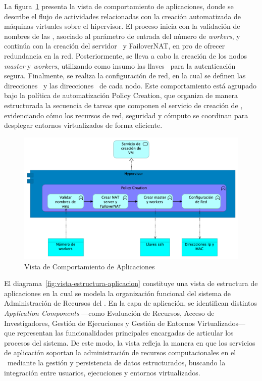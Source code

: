\noindent
La figura~\ref{fig:vista-comportamiento-aplicacion} presenta la vista de comportamiento de aplicaciones, donde se describe el flujo de actividades relacionadas con la creación automatizada de máquinas virtuales sobre el hipervisor. El proceso inicia con la validación de nombres de las \VM, asociado al parámetro de entrada del número de \textit{workers}, y continúa con la creación del servidor \NAT\ y FailoverNAT, en pro de ofrecer redundancia en la red. Posteriormente, se lleva a cabo la creación de los nodos \textit{master} y \textit{workers}, utilizando como insumo las llaves \SSH\ para la autenticación segura. Finalmente, se realiza la configuración de red, en la cual se definen las direcciones \IP\ y las direcciones \MAC\ de cada nodo. Este comportamiento está agrupado bajo la política de automatización Policy Creation, que organiza de manera estructurada la secuencia de tareas que componen el servicio de creación de \VM, evidenciando cómo los recursos de red, seguridad y cómputo se coordinan para desplegar entornos virtualizados de forma eficiente.
\begin{figure}[H]
    \centering
    \includegraphics[width=\textwidth]{tablas-images/cp6/Application-Behaviour-view.png}
    \caption{Vista de Comportamiento de Aplicaciones}\label{fig:vista-comportamiento-aplicacion}
\end{figure}
\noindent
El diagrama~\ref{fig:vista-estructura-aplicacion} constituye una vista de estructura de aplicaciones en la cual se modela la organización funcional del sistema de Administración de Recursos del \GRID. En la capa de aplicación, se identifican distintos \textit{Application Components} —como Evaluación de Recursos, Acceso de Investigadores, Gestión de Ejecuciones y Gestión de Entornos Virtualizados— que representan las funcionalidades principales encargadas de articular los procesos del sistema. De este modo, la vista refleja la manera en que los servicios de aplicación soportan la administración de recursos computacionales en el \GRID\ mediante la gestión y persistencia de datos estructurados, buscando la integración entre usuarios, ejecuciones y entornos virtualizados.
